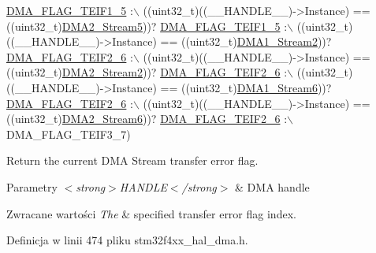 \begin{DoxyCode}
      \hyperlink{group___d_m_a__flag__definitions_ga9d4c5bac7bdcdb23b4d38186e918ae9e}{DMA\_FLAG\_TEIF1\_5} :\(\backslash\)
 ((uint32\_t)((\_\_HANDLE\_\_)->Instance) == ((uint32\_t)\hyperlink{group___peripheral__declaration_gac40f58718761251875b5a897287efd83}{DMA2\_Stream5}))? 
      \hyperlink{group___d_m_a__flag__definitions_ga9d4c5bac7bdcdb23b4d38186e918ae9e}{DMA\_FLAG\_TEIF1\_5} :\(\backslash\)
 ((uint32\_t)((\_\_HANDLE\_\_)->Instance) == ((uint32\_t)\hyperlink{group___peripheral__declaration_gad0e2140b8eeec3594035f1a7bf2a7250}{DMA1\_Stream2}))? 
      \hyperlink{group___d_m_a__flag__definitions_ga7801bd49cbbe19be612718965e8c675e}{DMA\_FLAG\_TEIF2\_6} :\(\backslash\)
 ((uint32\_t)((\_\_HANDLE\_\_)->Instance) == ((uint32\_t)\hyperlink{group___peripheral__declaration_ga71bb410664b861ff0520f08976e24ee1}{DMA2\_Stream2}))? 
      \hyperlink{group___d_m_a__flag__definitions_ga7801bd49cbbe19be612718965e8c675e}{DMA\_FLAG\_TEIF2\_6} :\(\backslash\)
 ((uint32\_t)((\_\_HANDLE\_\_)->Instance) == ((uint32\_t)\hyperlink{group___peripheral__declaration_gac95127480470900755953f1cfe68567d}{DMA1\_Stream6}))? 
      \hyperlink{group___d_m_a__flag__definitions_ga7801bd49cbbe19be612718965e8c675e}{DMA\_FLAG\_TEIF2\_6} :\(\backslash\)
 ((uint32\_t)((\_\_HANDLE\_\_)->Instance) == ((uint32\_t)\hyperlink{group___peripheral__declaration_ga11a00b283e0911cd427e277e5a314ccc}{DMA2\_Stream6}))? 
      \hyperlink{group___d_m_a__flag__definitions_ga7801bd49cbbe19be612718965e8c675e}{DMA\_FLAG\_TEIF2\_6} :\(\backslash\)
   DMA\_FLAG\_TEIF3\_7)
\end{DoxyCode}


Return the current D\+MA Stream transfer error flag. 


\begin{DoxyParams}{Parametry}
{\em $<$strong$>$\+H\+A\+N\+D\+L\+E$<$/strong$>$} & D\+MA handle \\
\hline
\end{DoxyParams}

\begin{DoxyRetVals}{Zwracane wartości}
{\em The} & specified transfer error flag index. \\
\hline
\end{DoxyRetVals}


Definicja w linii 474 pliku stm32f4xx\+\_\+hal\+\_\+dma.\+h.

\mbox{\label{group___d_m_a_gaadcee34f0999c8eafd37de2f69daa0ac}} 
